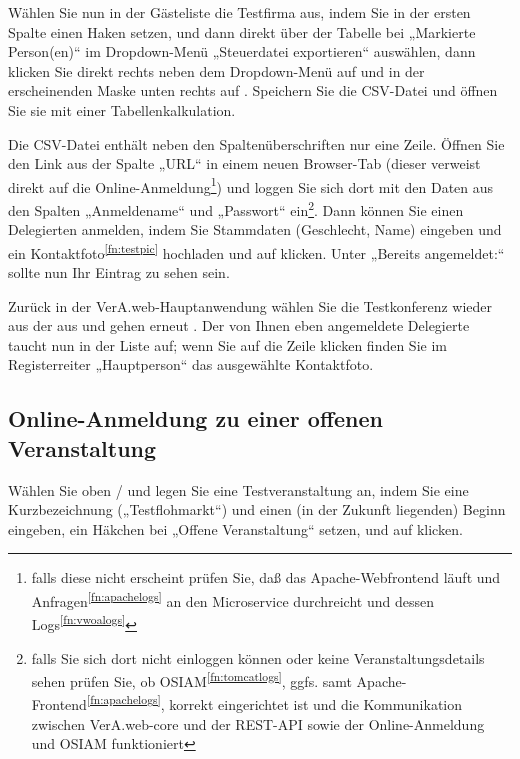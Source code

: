 Wählen Sie nun in der Gästeliste die Testfirma aus, indem Sie in der
ersten Spalte einen Haken setzen, und dann direkt über der Tabelle
bei „Markierte Person(en)“ im Dropdown-Menü „Steuerdatei exportieren“
auswählen, dann klicken Sie direkt rechts neben dem Dropdown-Menü auf
 und in der erscheinenden Maske unten rechts
auf . Speichern Sie die CSV-Datei und öffnen
Sie sie mit einer Tabellenkalkulation.

Die CSV-Datei enthält neben den Spaltenüberschriften nur eine Zeile.
Öffnen Sie den Link aus der Spalte „URL“ in einem neuen Browser-Tab
(dieser verweist direkt auf die Online-Anmeldung\Hair\footnote{falls
diese nicht erscheint prüfen Sie, daß das Apache-Webfrontend läuft und
Anfragen\Hair\textsuperscript{\ref{fn:apachelogs}} an den Microservice
durchreicht und dessen Logs\Hair\textsuperscript{\ref{fn:vwoalogs}}})
und loggen Sie sich dort mit den Daten aus den Spalten „Anmeldename“
und „Passwort“ ein\Hair\footnote{\label{fn:inttst-osiam}falls Sie sich
dort nicht einloggen können oder keine Veranstaltungsdetails sehen
prüfen Sie, ob OSIAM\Hair\textsuperscript{\ref{fn:tomcatlogs}}, ggfs.
samt Apache-Frontend\Hair\textsuperscript{\ref{fn:apachelogs}}, korrekt
eingerichtet ist und die Kommunikation zwischen VerA.web-core und der
REST-API sowie der Online-Anmeldung und OSIAM funktioniert}. Dann können
Sie einen Delegierten anmelden, indem Sie Stammdaten (Geschlecht, Name)
eingeben und ein Kontaktfoto\Hair\textsuperscript{\ref{fn:testpic}}
hochladen und auf  klicken.
Unter „Bereits angemeldet:“ sollte nun Ihr Eintrag zu sehen sein.

Zurück in der VerA.web-Hauptanwendung wählen Sie die Testkonferenz
wieder aus der  aus und gehen
erneut . Der von Ihnen eben angemeldete
Delegierte taucht nun in der Liste auf; wenn Sie auf die Zeile klicken
finden Sie im Registerreiter „Hauptperson“ das ausgewählte Kontaktfoto.

\subsection{Online-Anmeldung zu einer offenen Veranstaltung}

Wählen Sie oben  /  und legen Sie eine Testveranstaltung an, indem Sie eine
Kurzbezeichnung („Testflohmarkt“) und einen (in der Zukunft liegenden)
Beginn eingeben, ein Häkchen bei „Offene Veranstaltung“ setzen, und
auf  klicken.

